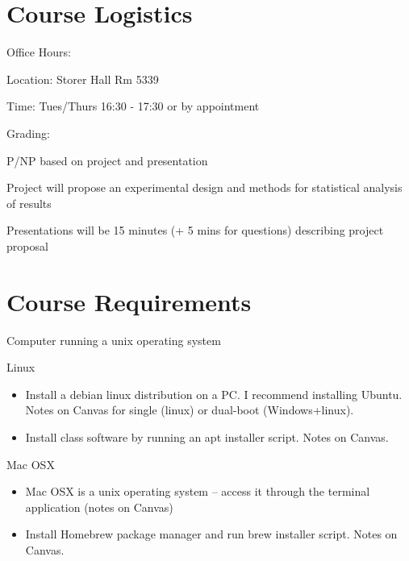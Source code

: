 \documentclass[xetex]{beamer}
\begin{document}
\section{Course Logistics}
\label{sec:orgc4d3cc0}
\begin{frame}[label={sec:orgeb11621}]{Office Hours:}
\begin{block}{Location: Storer Hall Rm 5339}
\end{block}
\begin{block}{Time: Tues/Thurs 16:30 - 17:30 or by appointment}
\end{block}
\end{frame}
\begin{frame}[label={sec:org72d2911}]{Grading:}
\begin{block}{P/NP based on project and presentation}
\end{block}
\begin{block}{Project will propose an experimental design and methods for statistical analysis of results}
\end{block}
\begin{block}{Presentations will be 15 minutes (+ 5 mins for questions) describing project proposal}
\end{block}
\end{frame}
\section{Course Requirements}
\label{sec:org21b6ca2}
\begin{frame}[label={sec:orgb524738}]{Computer running a unix operating system}
\begin{block}{Linux}
\begin{itemize}
\item Install a debian linux distribution on a PC. I recommend installing Ubuntu. Notes on Canvas for single (linux) or dual-boot (Windows+linux).
\item Install class software by running an apt installer script. Notes on Canvas.
\end{itemize}
\end{block}
\begin{block}{Mac OSX}
\begin{itemize}
\item Mac OSX is a unix operating system -- access it through the terminal application (notes on Canvas)
\item Install Homebrew package manager and run brew installer script. Notes on Canvas.
\end{itemize}
\end{block}
\end{frame}
\end{document}
